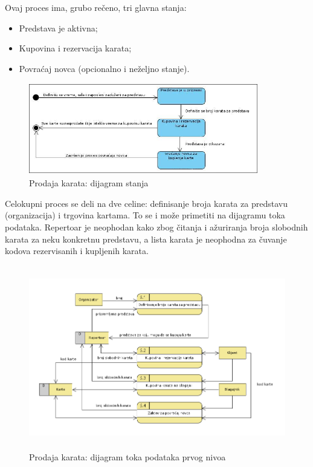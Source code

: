 \documentclass[a4paper]{article}
\begin{document}
Ovaj proces ima, grubo rečeno, tri glavna stanja:
\begin{itemize}
  \item Predstava je aktivna;
  \item Kupovina i rezervacija karata;
  \item Povraćaj novca (opcionalno i neželjno stanje).
\end{itemize}

\begin{figure}[H]
  \begin{center}
      \includegraphics[width=100mm,height=40mm]{../images/state_prodaja_karata.jpg}
  \end{center}
  \caption{Prodaja karata: dijagram stanja}
  \label{state_prodaja_karata}
\end{figure}

Celokupni proces se deli na dve celine: definisanje broja karata za predstavu (organizacija) i trgovina 
kartama. To se i može primetiti na dijagramu toka podataka. Repertoar je neophodan kako zbog čitanja
i ažuriranja broja slobodnih karata za neku konkretnu predstavu, a lista karata je neophodna za čuvanje
kodova rezervisanih i kupljenih karata.  

\begin{figure}[H]
  \begin{center}
      \includegraphics[width=120mm,height=80mm]{../images/dfd2_prodaja_karata.png}
  \end{center}
  \caption{Prodaja karata: dijagram toka podataka prvog nivoa}
  \label{dfd2_prodaja_karata}
\end{figure}
\end{document}
